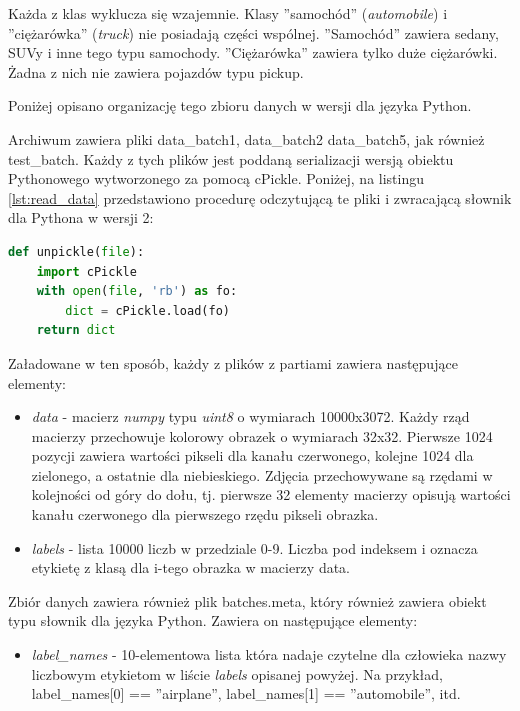 Każda z klas wyklucza się wzajemnie. Klasy ''samochód'' (\textit{automobile}) i ''ciężarówka'' (\textit{truck}) nie posiadają części wspólnej. ''Samochód'' zawiera sedany, SUVy i inne tego typu samochody. ''Ciężarówka'' zawiera tylko duże ciężarówki. Żadna z nich nie zawiera pojazdów typu pickup.

Poniżej opisano organizację tego zbioru danych w wersji dla języka Python.

Archiwum zawiera pliki data\_batch1, data\_batch2 data\_batch5, jak również test\_batch. Każdy z tych plików jest poddaną serializacji wersją obiektu Pythonowego wytworzonego za pomocą cPickle. Poniżej, na listingu \ref{lst:read_data} przedstawiono procedurę odczytującą te pliki i zwracającą słownik dla Pythona w wersji 2:

\begin{lstlisting}[caption={Procedura ładowania zbioru danych},label={lst:read_data},language=Python,captionpos=b,frame=single]
def unpickle(file):
    import cPickle
    with open(file, 'rb') as fo:
        dict = cPickle.load(fo)
    return dict
\end{lstlisting}

    Załadowane w ten sposób, każdy z plików z partiami zawiera następujące elementy:
\begin{itemize}
\item \textit{data} - macierz \textit{numpy} typu \textit{uint8} o wymiarach 10000x3072. Każdy rząd macierzy przechowuje kolorowy obrazek o wymiarach 32x32. Pierwsze 1024 pozycji zawiera wartości pikseli dla kanału czerwonego, kolejne 1024 dla zielonego, a ostatnie dla niebieskiego. Zdjęcia przechowywane są rzędami w kolejności od góry do dołu, tj. pierwsze 32 elementy macierzy opisują wartości kanału czerwonego dla pierwszego rzędu pikseli obrazka.
\item \textit{labels} - lista 10000 liczb w przedziale 0-9. Liczba pod indeksem i oznacza etykietę z klasą dla i-tego obrazka w macierzy data.
\end{itemize}

Zbiór danych zawiera również plik batches.meta, który również zawiera obiekt typu słownik dla języka Python. Zawiera on następujące elementy:
\begin{itemize}
\item \textit{label\_names} - 10-elementowa lista która nadaje czytelne dla człowieka nazwy liczbowym etykietom w liście \textit{labels} opisanej powyżej. Na przykład, label\_names[0] == ''airplane'', label\_names[1] == ''automobile'', itd. \cite{Krizhevsky09learningmultiple}
\end{itemize}


